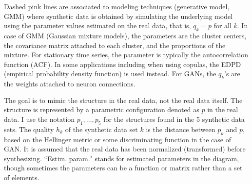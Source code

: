 \documentclass[oneside,10pt]{book}
\begin{document}
Dashed pink lines are associated to modeling techniques (generative model, GMM) where synthetic data is obtained by simulating the underlying model using the parameter values estimated on the real data, that is, $q_k = p$ for all $k$. In case of GMM (\textcolor{index}{Gaussian mixture models}), the parameters are the cluster centers, the covariance matrix attached to each cluster, and the proportions of the mixture. For stationary time series, the parameter is typically the autocorrelation function (ACF). In some applications including when using \textcolor{index}{copulas}, the EDPD (empirical probability density function) is used instead. For GANs, the $q_k$'s are the weights attached to neuron connections.

The goal is to mimic the structure in the real data, not the real data itself. The structure is represented by a parametric configuration denoted as $p$ in the real data. I use the notation $p_1,\dots,p_5$ for the structures found in the 5 synthetic data sets. The quality $h_k$ of the synthetic data set $k$ is the distance between $p_k$ and $p$, based on the
\textcolor{index}{Hellinger metric} or some discriminating function in the case of GAN. It is assumed that the real data has been normalized (transformed) before synthesizing. ``Estim. param." stands for estimated parameters in the diagram, though sometimes the parameters can be a function or matrix rather than a set of elements.
\end{document}
